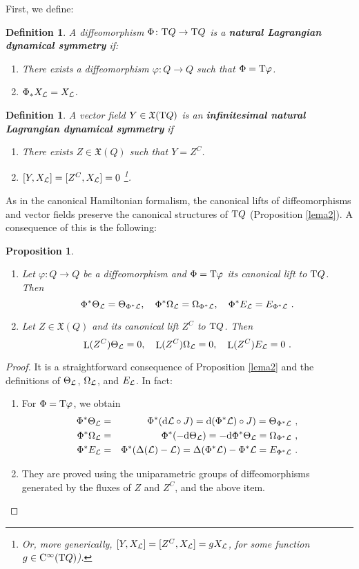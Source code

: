 \documentclass[12pt]{report}
\newtheorem{prop}[teor]{Proposition}
\newtheorem{definition}[teor]{Definition}
\def\beann{\begin{eqnarray*}}
\def\eeann{\end{eqnarray*}}
\def\ben{\begin{enumerate}}
\def\een{\end{enumerate}}
\def\qed{\ifvmode\removelastskip\fi
{\unskip\nobreak\hfil\penalty50\hbox{}\nobreak\hfil
\hbox{\vrule height1.2ex width1.2ex}\parfillskip=0pt
\finalhyphendemerits=0 \par\smallskip}}
\def\vf{\mathfrak X}
\def\Lag{{\cal L}}
\def\d{{\rm d}}
\def\Tan{{\rm T}}
\def\Lie{\mathop{\rm L}\nolimits}
\def\Cinfty{{\rm C}^\infty}
\begin{document}
First, we define:

\begin{definition}
A diffeomorphism $\Phi\colon\Tan Q\to \Tan Q$ is a
\textbf{natural Lagrangian dynamical symmetry} if:
\ben
\item
There exists a diffeomorphism $\varphi\colon Q\to Q$ such that $\Phi=\Tan\varphi$.
\item
$\Phi_*X_\Lag=X_\Lag$.
\een
\label{dls}
\end{definition}

\begin{definition}
A vector field $Y\in\vf(\Tan Q)$ is an
\textbf{ infinitesimal natural Lagrangian dynamical symmetry} if
\ben
\item
There exists $Z\in\vf (Q)$ such that $Y=Z^{C}$.
 \item
$[Y,X_\Lag]=[Z^{C},X_\Lag]=0$
\footnote{
Or, more generically,
$[Y,X_\Lag]=[Z^{C},X_\Lag]=gX_\Lag$, for some function $g\in\Cinfty(\Tan Q)$).}.
\een
\label{dlsinf}
\end{definition}

As in the canonical Hamiltonian formalism,
the canonical lifts of diffeomorphisms and vector fields
preserve  the canonical structures of $\Tan Q$ (Proposition \ref{lema2}).
A consequence of this is the following:

\begin{prop}
\label{lema3}
\ben
\item
 Let $\varphi\colon Q\to Q$ be a diffeomorphism and
$\Phi=\Tan\varphi$ its canonical lift to $\Tan Q$. Then
$$
\Phi^*\Theta_\Lag=\Theta_{\Phi^*\Lag} ,\quad
\Phi^*\Omega_\Lag=\Omega_{\Phi^*\Lag} ,\quad
\Phi^*E_\Lag=E_{\Phi^*\Lag} \ .
$$
\item
Let $Z\in\vf (Q)$ and its canonical lift $Z^C$ to $\Tan Q$. Then
$$
\Lie(Z^C)\Theta_\Lag=0 ,\quad
\Lie(Z^C)\Omega_\Lag=0 ,\quad
\Lie(Z^C)E_\Lag=0 \ .
$$
\een
\end{prop}
\begin{proof}
It is a straightforward consequence of Proposition \ref{lema2} and the
definitions of  $\Theta_\Lag$, $\Omega_\Lag$, and $E_\Lag$.
In fact:
\ben
\item
For $\Phi=\Tan\varphi$, we obtain
 \beann
 \Phi^*\Theta_\Lag&=& \Phi^*(\d \Lag\circ J)=\d (\Phi^*\Lag)\circ J)=\Theta_{\Phi^*\Lag} \ ,
\\
\Phi^*\Omega_\Lag&=&\Phi^*(-\d\Theta_\Lag)=-\d\Phi^*\Theta_\Lag=\Omega_{\Phi^*\Lag} \ ,
 \\
\Phi^*E_\Lag&=&\Phi^*(\Delta(\Lag)-\Lag)=\Delta(\Phi^*\Lag)-\Phi^*\Lag=E_{\Phi^*\Lag} \ .
\eeann
\item
They are proved using the uniparametric groups of diffeomorphisms generated by
 the fluxes of $Z$ and $Z^C$, and the above item.
 \een
 \qed \end{proof}
\end{document}
